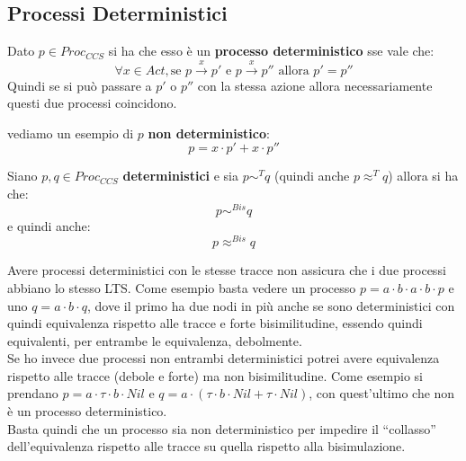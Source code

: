 \subsection{Processi Deterministici}
\begin{definizione}
  Dato $p\in Proc_{CCS}$ si ha che esso è un \textbf{processo deterministico}
  sse vale che:
  \[\forall x\in Act,\mbox{se } p\stackrel{x}{\rightarrow}p'\mbox{ e
    }p\stackrel{x}{\rightarrow}p''\mbox{ allora }p'=p''\]
  Quindi se si può passare a $p'$ o $p''$ con la stessa azione allora
  necessariamente questi due processi coincidono.
\end{definizione}
\begin{esempio}
  vediamo un esempio di $p$ \textbf{non deterministico}:
  \[p=x\cdot p'+x\cdot p''\]
\end{esempio}
\begin{definizione}
  Siano $p, q\in Proc_{CCS}$ \textbf{deterministici} e sia $p\sim^Tq$ (quindi
  anche $p\approx^Tq$) allora si ha che:
  \[p\sim^{Bis}q\]
  e quindi anche:
  \[p\approx^{Bis}q\]
\end{definizione}
Avere processi deterministici con le stesse tracce non assicura che i due
processi abbiano lo stesso LTS. Come esempio basta vedere un processo $p=a\cdot
b\cdot a\cdot b\cdot p$ e uno $q=a\cdot b\cdot q$, dove il primo ha due nodi in
più anche se sono deterministici con quindi equivalenza rispetto alle tracce e
forte bisimilitudine, essendo quindi equivalenti, per entrambe le equivalenza,
debolmente.\\ 
Se ho invece due processi non entrambi deterministici potrei avere equivalenza
rispetto alle tracce (debole e forte) ma non bisimilitudine. Come esempio si
prendano $p=a\cdot \tau\cdot b\cdot Nil$ e $q=a\cdot(\tau\cdot b\cdot Nil+\tau
\cdot Nil)$, con quest'ultimo che non è un processo deterministico.\\
Basta quindi che un processo sia non deterministico per impedire il ``collasso''
dell'equivalenza rispetto alle tracce su quella rispetto alla bisimulazione.\\
  
